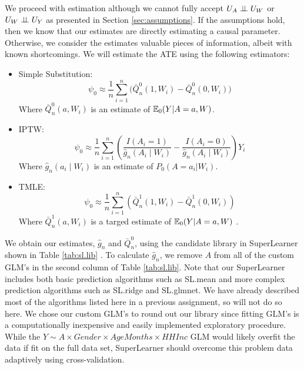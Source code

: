 \documentclass{article}
\begin{document}
We proceed with estimation although we cannot fully accept $U_A \perp\hspace{-5pt}\perp U_W$ or $U_W \perp\hspace{-5pt}\perp U_Y$ as presented in Section \ref{sec:assumptions}. If the assumptions hold, then we know that our estimates are directly estimating a causal parameter. Otherwise, we consider the estimates valuable pieces of information, albeit with known shortcomings. We will estimate the ATE using the following estimators: 

\begin{itemize}
  \item Simple Substitution:
    \[
      \psi_0 \approx \frac{1}{n}\sum_{i=1}^{n}\Big(\bar{Q}_{n}^{0}(1,W_i) - \bar{Q}_{n}^{0}(0,W_i)\Big)
    \]
Where $\bar{Q}_{n}^{0}(a,W_i)$ is an estimate of $\mathbb{E}_0(Y|A=a,W)$.
  \item IPTW:
  \[
    \psi_{0} \approx \frac{1}{n}\sum_{i=1}^{n} \left(\frac{I(A_i=1)}{\hat{g}_n(A_i \mid W_i)} - \frac{I(A_i=0)}{\hat{g}_n(A_i \mid W_i)} \right)Y_i
  \]
Where $\hat{g}_n(a_i \mid W_i)$ is an estimate of $P_0(A=a_i|W_i)$.
  \item TMLE:
  \[
    \psi_{0} \approx \frac{1}{n}\sum_{i=1}^{n}\left( \bar{Q}_{n}^{1}(1,W_i) - \bar{Q}_{n}^{1}(0,W_i)\right)
  \]
Where $\bar{Q}_{n}^{1}(a,W_i)$ is a targed estimate of $\mathbb{E}_0(Y|A=a,W)$ \cite{tmle}.
\end{itemize}


We obtain our estimates, $\hat{g}_{n}$ and $\bar{Q}_{n}^0$, using the candidate library in SuperLearner shown in Table \ref{tab:sl.lib} \cite{superlearner}. To calculate $\hat{g}_{n}$, we remove $A$ from all of the custom GLM's in the second column of Table \ref{tab:sl.lib}. Note that our SuperLearner includes both basic prediction algorithms such as SL.mean and more complex prediction algorithms such as SL.ridge and SL.glmnet. We have already described most of the algorithms listed here in a previous assignment, so will not do so here. We chose our custom GLM's to round out our library since fitting GLM's is a computationally inexpensive and easily implemented exploratory procedure. While the $Y \sim A \times Gender \times AgeMonths \times HHInc$ GLM would likely overfit the data if fit on the full data set, SuperLearner should overcome this problem data adaptively using cross-validation.
\end{document}
